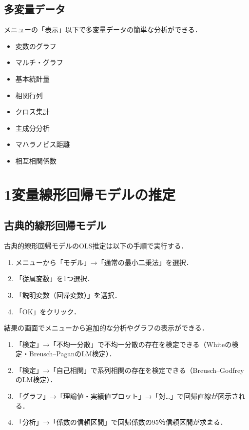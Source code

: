 \documentclass[
]{jlreq}
\providecommand{\tightlist}{%
  \setlength{\itemsep}{0pt}\setlength{\parskip}{0pt}}
\begin{document}
\subsection{多変量データ}\label{ux591aux5909ux91cfux30c7ux30fcux30bf}

メニューの「表示」以下で多変量データの簡単な分析ができる．

\begin{itemize}
\tightlist
\item
  変数のグラフ
\item
  マルチ・グラフ
\item
  基本統計量
\item
  相関行列
\item
  クロス集計
\item
  主成分分析
\item
  マハラノビス距離
\item
  相互相関係数
\end{itemize}

\section{1変量線形回帰モデルの推定}\label{ux5909ux91cfux7ddaux5f62ux56deux5e30ux30e2ux30c7ux30ebux306eux63a8ux5b9a}

\subsection{古典的線形回帰モデル}\label{ux53e4ux5178ux7684ux7ddaux5f62ux56deux5e30ux30e2ux30c7ux30eb}

古典的線形回帰モデルのOLS推定は以下の手順で実行する．

\begin{enumerate}
\def\labelenumi{\arabic{enumi}.}
\tightlist
\item
  メニューから「モデル」→「通常の最小二乗法」を選択．
\item
  「従属変数」を1つ選択．
\item
  「説明変数（回帰変数）」を選択．
\item
  「OK」をクリック．
\end{enumerate}

結果の画面でメニューから追加的な分析やグラフの表示ができる．

\begin{enumerate}
\def\labelenumi{\arabic{enumi}.}
\tightlist
\item
  「検定」→「不均一分散」で不均一分散の存在を検定できる（Whiteの検定・Breusch--PaganのLM検定）．
\item
  「検定」→「自己相関」で系列相関の存在を検定できる（Breusch--GodfreyのLM検定）．
\item
  「グラフ」→「理論値・実績値プロット」→「対\dots」で回帰直線が図示される．
\item
  「分析」→「係数の信頼区間」で回帰係数の95％信頼区間が求まる．
\end{enumerate}
\end{document}
